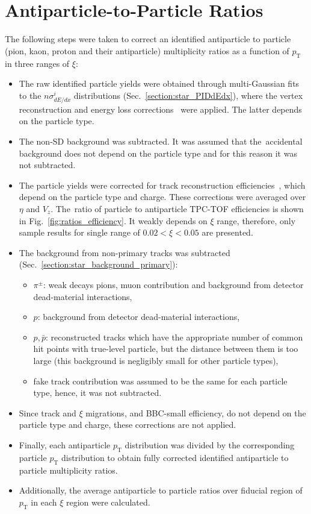 \section{Antiparticle-to-Particle Ratios}\label{section:star_ratios}
The following steps were taken to correct an  identified antiparticle to particle (pion, kaon, proton and their antiparticle) multiplicity ratios as a function of $p_\textrm{T}$ in three ranges of $\xi$:
\begin{itemize}
	\item The raw identified particle yields were obtained through multi-Gaussian fits to the $n\sigma^i_{dE/dx}$ distributions (Sec.~\ref{section:star_PIDdEdx}), where the vertex reconstruction and energy loss corrections~\cite{supplementaryNote} were applied. The latter depends on the particle type.
	\item The non-SD background was subtracted. It was assumed that the~accidental background does not depend on the particle type and for this reason it was not subtracted.
	\item The particle yields were corrected for track reconstruction efficiencies~\cite{supplementaryNote}, which depend on the particle type and charge. These corrections were averaged over $\eta$ and $V_{z}$.
	The~ratio of particle to antiparticle TPC-TOF efficiencies is shown in Fig.~\ref{fig:ratios_efficiency}.  It weakly depends on $\xi$ range, therefore, only sample results for single range of $0.02<\xi<0.05$  are presented.
	\item The background from non-primary tracks was subtracted (Sec.~\ref{section:star_background_primary}):
	\begin{itemize}
		\item $\pi^\pm$: weak decays pions, muon contribution and background from  detector dead-material interactions,
		\item $p$: background from  detector dead-material interactions,
		\item $p,\bar{p}$: reconstructed tracks which have the appropriate number of common hit points with true-level particle, but the distance between them is too large (this background is negligibly small for other particle types),
		\item fake track contribution was assumed to be the same for each particle type, hence, it was not subtracted. 
	\end{itemize}
	\item Since  track and $\xi$ migrations, and BBC-small efficiency, do not depend on the particle type and charge, these corrections are not applied.
	\item Finally, each antiparticle $p_\textrm{T}$ distribution was divided by the corresponding particle $p_\textrm{T}$ distribution to obtain fully corrected identified antiparticle to particle multiplicity ratios.
	\item Additionally, the average antiparticle to particle ratios over fiducial
	region of $p_\textrm{T}$ in each $\xi$ region were calculated.
	

\end{itemize}
